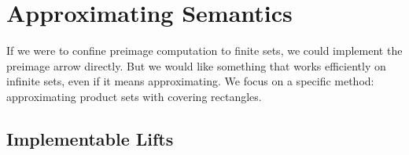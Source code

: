 
\section{Approximating Semantics}
\label{sec:approximating-semantics}

If we were to confine preimage computation to finite sets, we could implement the preimage arrow directly.
But we would like something that works efficiently on infinite sets, even if it means approximating.
We focus on a specific method: approximating product sets with covering rectangles.

\subsection{Implementable Lifts}

